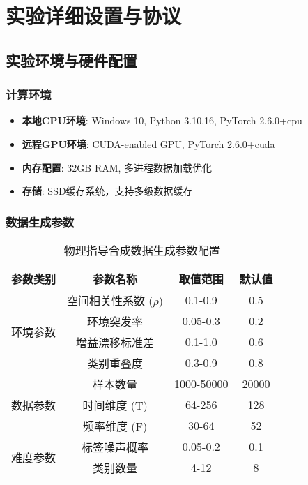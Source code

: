 \chapter{实验详细设置与协议}

\section{实验环境与硬件配置}

\subsection{计算环境}
\begin{itemize}
    \item \textbf{本地CPU环境}: Windows 10, Python 3.10.16, PyTorch 2.6.0+cpu
    \item \textbf{远程GPU环境}: CUDA-enabled GPU, PyTorch 2.6.0+cuda
    \item \textbf{内存配置}: 32GB RAM, 多进程数据加载优化
    \item \textbf{存储}: SSD缓存系统，支持多级数据缓存
\end{itemize}

\subsection{数据生成参数}
\begin{table}[h!]
\centering
\caption{物理指导合成数据生成参数配置}
\begin{tabular}{|l|c|c|c|}
\hline
\textbf{参数类别} & \textbf{参数名称} & \textbf{取值范围} & \textbf{默认值} \\
\hline
\multirow{4}{*}{环境参数}
& 空间相关性系数 ($\rho$) & 0.1-0.9 & 0.5 \\
& 环境突发率 & 0.05-0.3 & 0.2 \\
& 增益漂移标准差 & 0.1-1.0 & 0.6 \\
& 类别重叠度 & 0.3-0.9 & 0.8 \\
\hline
\multirow{3}{*}{数据参数}
& 样本数量 & 1000-50000 & 20000 \\
& 时间维度 (T) & 64-256 & 128 \\
& 频率维度 (F) & 30-64 & 52 \\
\hline
\multirow{2}{*}{难度参数}
& 标签噪声概率 & 0.05-0.2 & 0.1 \\
& 类别数量 & 4-12 & 8 \\
\hline
\end{tabular}
\label{tab:data_gen_params}
\end{table}

